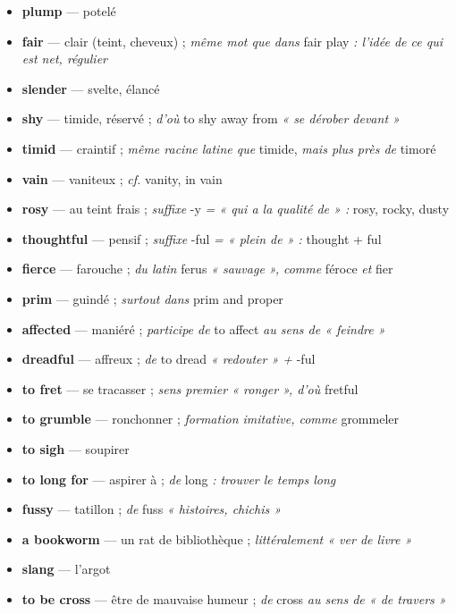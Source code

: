 \documentclass{fiche}
\begin{document}
\begin{itemize}[label=--,itemsep=0.8mm,leftmargin=*]\small
  \item \textbf{plump} — potelé
  \item \textbf{fair} — clair (teint, cheveux) ; \textit{même mot que dans} fair play \textit{: l'idée de ce qui est net, régulier}
  \item \textbf{slender} — svelte, élancé
  \item \textbf{shy} — timide, réservé ; \textit{d'où} to shy away from \textit{« se dérober devant »}
  \item \textbf{timid} — craintif ; \textit{même racine latine que} timide, \textit{mais plus près de} timoré
  \item \textbf{vain} — vaniteux ; \textit{cf.} vanity, in vain
  \item \textbf{rosy} — au teint frais ; \textit{suffixe} -y \textit{= « qui a la qualité de » :} rosy, rocky, dusty
  \item \textbf{thoughtful} — pensif ; \textit{suffixe} -ful \textit{= « plein de » :} thought + ful
  \item \textbf{fierce} — farouche ; \textit{du latin} ferus \textit{« sauvage », comme} féroce \textit{et} fier
  \item \textbf{prim} — guindé ; \textit{surtout dans} prim and proper
  \item \textbf{affected} — maniéré ; \textit{participe de} to affect \textit{au sens de « feindre »}
  \item \textbf{dreadful} — affreux ; \textit{de} to dread \textit{« redouter » +} -ful
  \item \textbf{to fret} — se tracasser ; \textit{sens premier « ronger », d'où} fretful
  \item \textbf{to grumble} — ronchonner ; \textit{formation imitative, comme} grommeler
  \item \textbf{to sigh} — soupirer
  \item \textbf{to long for} — aspirer à ; \textit{de} long \textit{: trouver le temps long}
  \item \textbf{fussy} — tatillon ; \textit{de} fuss \textit{« histoires, chichis »}
  \item \textbf{a bookworm} — un rat de bibliothèque ; \textit{littéralement « ver de livre »}
  \item \textbf{slang} — l'argot
  \item \textbf{to be cross} — être de mauvaise humeur ; \textit{de} cross \textit{au sens de « de travers »}
\end{itemize}
\end{document}
